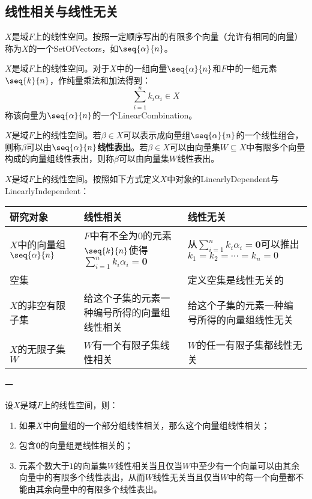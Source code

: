 \subsection{线性相关与线性无关}
\begin{definition}
	$X$是域$F$上的线性空间。按照一定顺序写出的有限多个向量（允许有相同的向量）称为$X$的一个\gls{SetOfVectors}，如$\seq{\alpha}{n}$。
\end{definition}
\begin{definition}
	$X$是域$F$上的线性空间。对于$X$中的一组向量$\seq{\alpha}{n}$和$F$中的一组元素$\seq{k}{n}$，作纯量乘法和加法得到：
	\begin{equation*}
		\sum_{i=1}^{n}k_i\alpha_i\in X
	\end{equation*}
	称该向量为$\seq{\alpha}{n}$的一个\gls{LinearCombination}。
\end{definition}
\begin{definition}
	$X$是域$F$上的线性空间。若$\beta\in X$可以表示成向量组$\seq{\alpha}{n}$的一个线性组合，则称$\beta$可以由$\seq{\alpha}{n}$\textbf{线性表出}。若$\beta\in X$可以由向量集$W\subseteq X$中有限多个向量构成的向量组线性表出，则称$\beta$可以由向量集$W$线性表出。
\end{definition}
\begin{definition}
	$X$是域$F$上的线性空间。按照如下方式定义$X$中对象的\gls{LinearlyDependent}与\gls{LinearlyIndependent}：
	\begin{table}[H]
		\centering
		\begin{tabular}{>{\centering\arraybackslash}p{4cm}|>{\centering\arraybackslash}p{5cm}|>{\centering\arraybackslash}p{6cm}}
			\toprule
			\textbf{研究对象} & \textbf{线性相关} & \textbf{线性无关} \\
			\midrule
			$X$中的向量组$\seq{\alpha}{n}$ & $F$中有不全为$0$的元素$\seq{k}{n}$使得$\sum\limits_{i=1}^{n}k_i\alpha_i=\mathbf{0}$ & 从$\sum\limits_{i=1}^{n}k_i\alpha_i=\mathbf{0}$可以推出$k_1=k_2=\cdots=k_n=0$ \\
			\hline
			空集 & & 定义空集是线性无关的\\
			\hline
			$X$的非空有限子集 & 给这个子集的元素一种编号所得的向量组线性相关 & 给这个子集的元素一种编号所得的向量组线性无关 \\
			\hline
			$X$的无限子集$W$ & $W$有一个有限子集线性相关 & $W$的任一有限子集都线性无关 \\
			\bottomrule
		\end{tabular}
	\end{table}
\end{definition}
一
\begin{property}\label{prop:LinearlyDependent}
	设$X$是域$F$上的线性空间，则：
	\begin{enumerate}
		\item 如果$X$中向量组的一个部分组线性相关，那么这个向量组线性相关；
		\item 包含$\mathbf{0}$的向量组是线性相关的；
		\item 元素个数大于$1$的向量集$W$线性相关当且仅当$W$中至少有一个向量可以由其余向量中的有限多个线性表出，从而$W$线性无关当且仅当$W$中的每一个向量都不能由其余向量中的有限多个线性表出。
	\end{enumerate}
\end{property}
